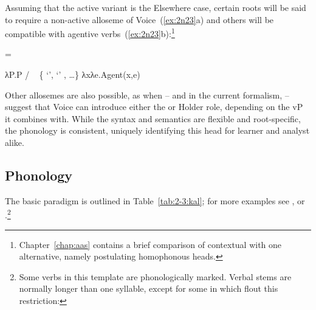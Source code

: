 \begin{exe}
\begin{xlist}
\begin{exe}
\begin{xlist}
\begin{exe}
\begin{xlist}
\begin{exe}
\begin{exe}
\begin{xlist}
\begin{exe}
\begin{xlist}
\begin{exe}
\begin{xlist}
\begin{exe}
\begin{xlist}
\begin{exe}
\begin{xlist}
\begin{exe}
\begin{xlist}
\begin{exe}
\begin{xlist}
\begin{exe}
\begin{xlist}
\begin{exe}
\begin{xlist}
\begin{exe}
\begin{xlist}
\begin{exe}
\begin{xlist}
\begin{exe}
\begin{xlist}
\begin{exe}
\begin{xlist}
\begin{exe}
\begin{exe}
\begin{xlist}
\begin{exe}
\begin{xlist}
\begin{exe}
\begin{xlist}
\begin{exe}
\begin{xlist}
{Assuming that the active variant is the Elsewhere case, certain roots will be said to require a non-active alloseme of Voice~(\ref{ex:2n23}a) and others will be compatible with agentive verbs~(\ref{ex:2n23}b):\footnote{Chapter~\ref{chap:aas} contains a brief comparison of contextual  with one alternative, namely postulating homophonous heads.}
 \begin{exe}
 \ex  \label{ex:2n23} =  
 \begin{xlist} 
 	\ex  λP.P \phantom{agent(x,e)xxx} / \trace~ \{  `',  `' , \dots \} 
 	\ex  λxλe.Agent(x,e) 
 \z
\z 

Other allosemes are also possible, as when \cite{kratzer96} -- and in the current formalism, \cite{woodmarantz17} -- suggest that Voice can introduce either the  or Holder role, depending on the vP it combines with. While the syntax and semantics are flexible and root-specific, the phonology is consistent, uniquely identifying this head for learner and analyst alike.
		
		\subsection{Phonology} \label{voice:voice:phono}
The basic paradigm is outlined in Table~\ref{tab:2-3:kal}; for more examples see \cite{schwarzwald08}, \cite{faust12} or \cite{kastner18nllt}.\footnote{Some verbs in this template are phonologically marked. Verbal stems are normally longer than one syllable, except for some in {\tkal} which flout this restriction:

}
\end{xlist}
\end{exe}}
\end{xlist}
\end{exe}
\end{xlist}
\end{exe}
\end{xlist}
\end{exe}
\end{xlist}
\end{exe}
\end{exe}
\end{xlist}
\end{exe}
\end{xlist}
\end{exe}
\end{xlist}
\end{exe}
\end{xlist}
\end{exe}
\end{xlist}
\end{exe}
\end{xlist}
\end{exe}
\end{xlist}
\end{exe}
\end{xlist}
\end{exe}
\end{xlist}
\end{exe}
\end{xlist}
\end{exe}
\end{xlist}
\end{exe}
\end{xlist}
\end{exe}
\end{xlist}
\end{exe}
\end{exe}
\end{xlist}
\end{exe}
\end{xlist}
\end{exe}
\end{xlist}
\end{exe}

